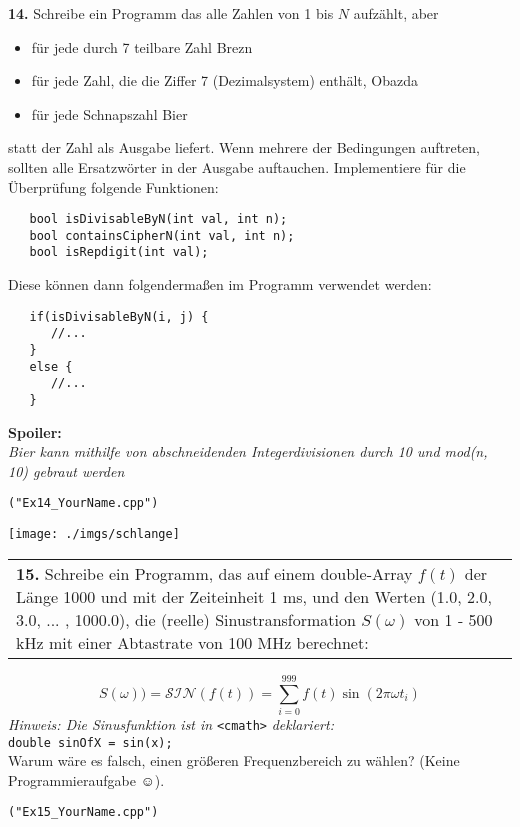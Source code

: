 \documentclass[paper=A4, pagesize, DIV=calc, smallheadings,
fontsize=11pt, expansion=false]{scrreprt}
\begin{document}
\textbf{14.} Schreibe ein Programm das alle Zahlen von 1 bis $N$ aufzählt, aber
  \begin{itemize}
  \item für jede durch 7 teilbare Zahl \glqq Brezn \grqq
  \item für jede Zahl, die die Ziffer 7 (Dezimalsystem) enthält, \glqq Obazda\grqq
  \item für jede Schnapszahl \glqq Bier \grqq
  \end{itemize}
  statt der Zahl als Ausgabe liefert. Wenn mehrere der Bedingungen auftreten, sollten alle Ersatzwörter in der Ausgabe auftauchen.  
  Implementiere für die Überprüfung folgende Funktionen:
\begin{verbatim}
   bool isDivisableByN(int val, int n); 
   bool containsCipherN(int val, int n);
   bool isRepdigit(int val);
\end{verbatim}
Diese können dann folgendermaßen im Programm verwendet werden:
\begin{verbatim}
   if(isDivisableByN(i, j) {
      //...
   }
   else {
      //...
   }
\end{verbatim}
  \Large
  \textbf{Spoiler:} \\
  \tiny
  \emph{Bier kann mithilfe von abschneidenden Integerdivisionen durch 10 und mod(n, 10) gebraut werden} 
  \normalsize
\begin{verbatim}
("Ex14_YourName.cpp")
\end{verbatim}





\newpage
\begin{minipage}[H]{0.3\linewidth}
\texttt{[image: ./imgs/schlange]}
\end{minipage}
\begin{tabular}{m{30em}}
\textbf{15.} Schreibe ein Programm, das auf einem double-Array $f(t)$ der Länge 1000 und mit der Zeiteinheit 1 ms, und den Werten (1.0, 2.0, 3.0, ... , 1000.0), die (reelle) Sinustransformation $S(\omega)$ von 1 - 500 kHz mit einer Abtastrate von 100 MHz berechnet:
\end{tabular}
  \[ S(\omega)) = \mathcal{SIN}(f(t))  = \sum_{i=0}^{999} f(t) \sin{(2 \pi \omega t_i)}\]
  \emph{Hinweis: Die Sinusfunktion ist in} \texttt{\textless cmath\textgreater}\emph{ deklariert:}\\
  \texttt{double sinOfX = sin(x);}\\
Warum wäre es falsch, einen größeren Frequenzbereich zu wählen? (Keine Programmieraufgabe $\smiley$).
\begin{verbatim}
("Ex15_YourName.cpp")
\end{verbatim}
\end{document}
